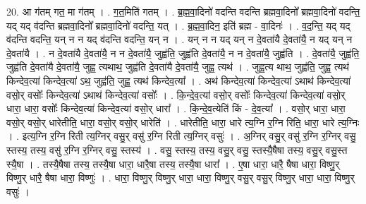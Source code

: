 \documentclass[17pt]{extarticle}
\begin{document}
20. आ ग॑तम् गत॒ मा ग॑तम् । . ग॒त॒मिति॑ गतम् । . ब्र॒ह्म॒वा॒दिनो॑ वदन्ति वदन्ति ब्रह्मवा॒दिनो᳚ ब्रह्मवा॒दिनो॑ वदन्ति॒ यद् यद् व॑दन्ति ब्रह्मवा॒दिनो᳚ ब्रह्मवा॒दिनो॑ वदन्ति॒ यत् । . ब्र॒ह्म॒वा॒दिन॒ इति॑ ब्रह्म - वा॒दिनः॑ । . व॒द॒न्ति॒ यद् यद् व॑दन्ति वदन्ति॒ यन् न न यद् व॑दन्ति वदन्ति॒ यन् न । . यन् न न यद् यन् न दे॒वता॑यै दे॒वता॑यै॒ न यद् यन् न दे॒वता॑यै । . न दे॒वता॑यै दे॒वता॑यै॒ न न दे॒वता॑यै॒ जुह्व॑ति॒ जुह्व॑ति दे॒वता॑यै॒ न न दे॒वता॑यै॒ जुह्व॑ति । . दे॒वता॑यै॒ जुह्व॑ति॒ जुह्व॑ति दे॒वता॑यै दे॒वता॑यै॒ जुह्व॒ त्यथाथ॒ जुह्व॑ति दे॒वता॑यै दे॒वता॑यै॒ जुह्व॒ त्यथ॑ । . जुह्व॒त्य थाथ॒ जुह्व॑ति॒ जुह्व॒ त्यथ॑ किन्देव॒त्या॑ किन्देव॒त्या॑ ऽथ॒ जुह्व॑ति॒ जुह्व॒ त्यथ॑ किन्देव॒त्या᳚ । . अथ॑ किन्देव॒त्या॑ किन्देव॒त्या॑ ऽथाथ॑ किन्देव॒त्या॑ वसो॒र् वसोः᳚ किन्देव॒त्या॑ ऽथाथ॑ किन्देव॒त्या॑ वसोः᳚ । . कि॒न्दे॒व॒त्या॑ वसो॒र् वसोः᳚ किन्देव॒त्या॑ किन्देव॒त्या॑ वसो॒र् धारा॒ धारा॒ वसोः᳚ किन्देव॒त्या॑ किन्देव॒त्या॑ वसो॒र् धारा᳚ । . कि॒न्दे॒व॒त्येति॑ किं - दे॒व॒त्या᳚ । . वसो॒र् धारा॒ धारा॒ वसो॒र् वसो॒र् धारेतीति॒ धारा॒ वसो॒र् वसो॒र् धारेति॑ । . धारेतीति॒ धारा॒ धारे त्य॒ग्नि र॒ग्नि रिति॒ धारा॒ धारे त्य॒ग्निः । . इत्य॒ग्नि र॒ग्नि रिती त्य॒ग्निर् वसु॒र् वसु॑ र॒ग्नि रिती त्य॒ग्निर् वसुः॑ । . अ॒ग्निर् वसु॒र् वसु॑ र॒ग्नि र॒ग्निर् वसु॒ स्तस्य॒ तस्य॒ वसु॑ र॒ग्नि र॒ग्निर् वसु॒ स्तस्य॑ । . वसु॒ स्तस्य॒ तस्य॒ वसु॒र् वसु॒ स्तस्यै॒षैषा तस्य॒ वसु॒र् वसु॒स्त स्यै॒षा । . तस्यै॒षैषा तस्य॒ तस्यै॒षा धारा॒ धारै॒षा तस्य॒ तस्यै॒षा धारा᳚ । . ए॒षा धारा॒ धारै॒ षैषा धारा॒ विष्णु॒र् विष्णु॒र् धारै॒ षैषा धारा॒ विष्णुः॑ । . धारा॒ विष्णु॒र् विष्णु॒र् धारा॒ धारा॒ विष्णु॒र् वसु॒र् वसु॒र् विष्णु॒र् धारा॒ धारा॒ विष्णु॒र् वसुः॑ । \newline
\end{document}
